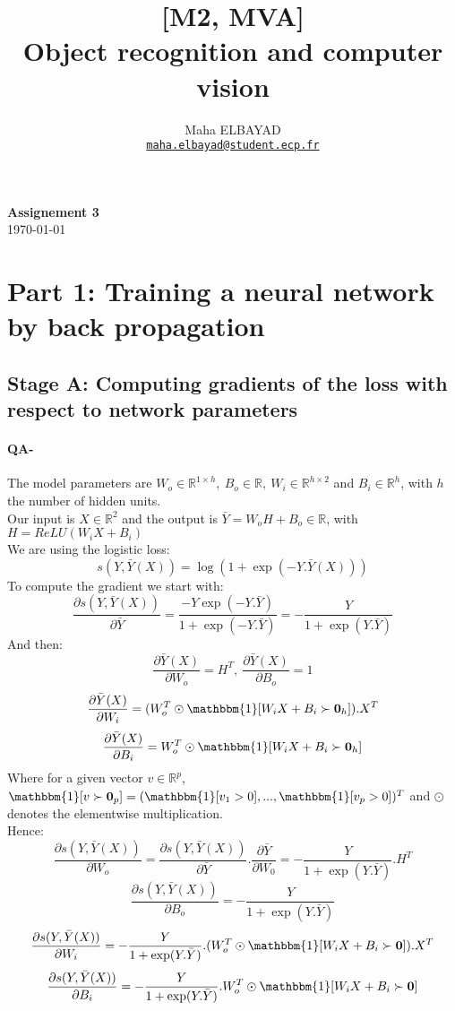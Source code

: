\documentclass[11pt]{article}
\title{[M2, MVA]\\ Object recognition and computer vision}
\author{Maha ELBAYAD\\ \href{mailto:maha.elbayad@student.ecp.fr}{\tt maha.elbayad@student.ecp.fr}}
\date{}
\newcommand{\R}{\mathbb{R}}
\newcommand{\1}{\mathbbm{1}}
\newcommand{\0}{\mathbf{0}}
\begin{document}
\maketitle
\vspace{-10pt}
\begin{center}
{\huge \bf Assignement 3}\\
\today
\vspace{10pt}
\end{center}

\vspace{7pt}

\section*{Part 1: Training a neural network by back­ propagation}
\subsection*{Stage A: Computing gradients of the loss with respect to network parameters}
	\paragraph{QA-}
		The model parameters are $W_o\in\R^{1\times h},\:B_o\in\R,\:W_i\in\R^{h\times 2}$ and $B_i\in\R^h$, with $h$ the number of hidden units.\\
		Our input is $X\in\R^2$ and the output is $\bar Y=W_oH+B_o\in\R$, with $H=ReLU(W_iX+B_i)$\\
		We are using the logistic loss:
		\[s(Y,\bar Y(X))=\log(1+\exp(-Y.\bar Y(X)))\]
		To compute the gradient we start with:
		\[\frac{\partial s(Y,\bar Y(X))}{\partial \bar Y}=\frac{-Y\exp(-Y.\bar Y)}{1+\exp(-Y.\bar Y)}=-\frac{Y}{1+\exp(Y.\bar Y)}\]
		And then:
		\[\frac{\partial \bar Y(X)}{\partial W_o}=H^T,\:\frac{\partial \bar Y(X)}{\partial B_o}=1\]
		\[\frac{\partial\bar Y(X)}{\partial W_i}=(W_o^T\odot \1[W_iX+B_i\succ\0_h]).X^T\]
		\[\frac{\partial\bar Y(X)}{\partial B_i}=W_o^T\odot \1[W_iX+B_i\succ\0_h]\]
		Where for a given vector $v\in\R^p$, $\1[v\succ \0_p]=(\1[v_1>0],...,\1[v_p>0])^T$ and $\odot$ denotes the elementwise multiplication.\\
		Hence:
		\[\frac{\partial s(Y,\bar Y(X))}{\partial W_o}=\frac{\partial s(Y,\bar Y(X))}{\partial \bar Y}.\frac{\partial \bar Y}{\partial W_0}=-\frac{Y}{1+\exp(Y.\bar Y)}.H^T\]
		\[\frac{\partial s(Y,\bar Y(X))}{\partial B_o}=-\frac{Y}{1+\exp(Y.\bar Y)}\]
		\[\frac{\partial s(Y,\bar Y(X))}{\partial W_i}=-\frac{Y}{1+\exp(Y.\bar Y)}.(W_o^T\odot \1[W_iX+B_i\succ\0]).X^T\]
		\[\frac{\partial s(Y,\bar Y(X))}{\partial B_i}=-\frac{Y}{1+\exp(Y.\bar Y)}.W_o^T\odot \1[W_iX+B_i\succ\0]\]
\end{document}

